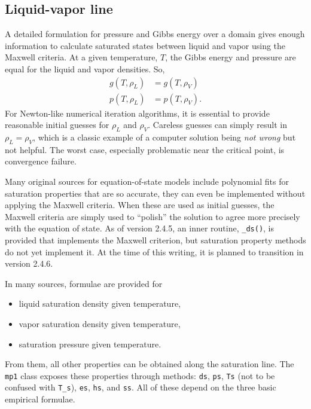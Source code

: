 \subsection{Liquid-vapor line}

A detailed formulation for pressure and Gibbs energy over a domain gives enough information to calculate saturated states between liquid and vapor using the Maxwell criteria.  At a given temperature, $T$, the Gibbs energy and pressure are equal for the liquid and vapor densities.  So,
\begin{subequations}
\begin{align}
g(T,\rho_L) &= g(T,\rho_V)\\
p(T,\rho_L) &= p(T,\rho_V).
\end{align}
\end{subequations}
For Newton-like numerical iteration algorithms, it is essential to provide reasonable initial guesses for $\rho_L$ and $\rho_V$.  Careless guesses can simply result in $\rho_L = \rho_V$, which is a classic example of a computer solution being \emph{not wrong} but not helpful.  The worst case, especially problematic near the critical point, is convergence failure.

Many original sources for equation-of-state models include polynomial fits for saturation properties that are so accurate, they can even be implemented without applying the Maxwell criteria.  When these are used as initial guesses, the Maxwell criteria are simply used to ``polish'' the solution to agree more precisely with the equation of state.  As of version 2.4.5, an inner routine, \texttt{\_ds()}, is provided that implements the Maxwell criterion, but saturation property methods do not yet implement it.  At the time of this writing, it is planned to transition in version 2.4.6.

In many sources, formulae are provided for
\begin{itemize}
\item liquid saturation density given temperature,
\item vapor saturation density given temperature,
\item saturation pressure given temperature.
\end{itemize}
From them, all other properties can be obtained along the saturation line.  The \texttt{mp1} class exposes these properties through methods: \texttt{ds}, \texttt{ps}, \texttt{Ts} (not to be confused with \verb|T_s|), \texttt{es}, \texttt{hs}, and \texttt{ss}.  All of these depend on the three basic empirical formulae.

